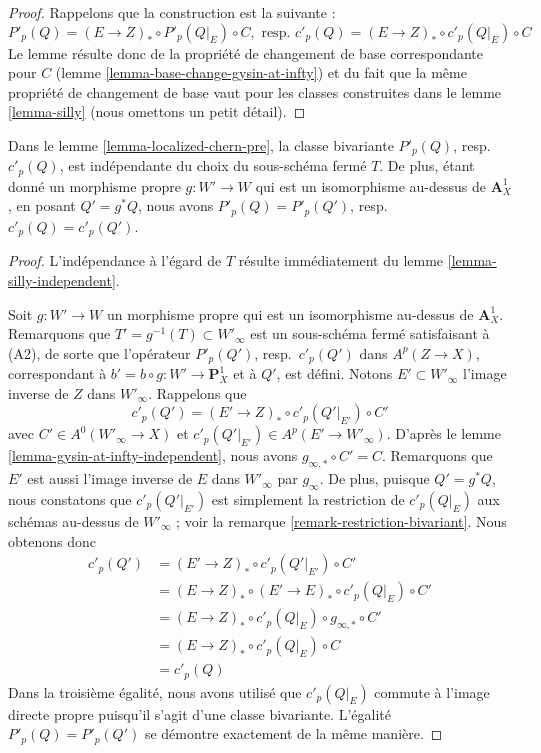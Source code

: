 \begin{proof}
Rappelons que la construction est la suivante :
$$
P'_p(Q) = (E \to Z)_* \circ P'_p(Q|_E) \circ C,\text{ resp. }
c'_p(Q) = (E \to Z)_* \circ c'_p(Q|_E) \circ C
$$
Le lemme résulte donc de la propriété de changement de base correspondante
pour $C$ (lemme \ref{lemma-base-change-gysin-at-infty})
et du fait que la même propriété de changement de base vaut pour les classes
construites dans le lemme \ref{lemma-silly} (nous omettons un petit détail).
\end{proof}

\begin{lemma}
\label{lemma-localized-chern-pre-independent}
Dans le lemme \ref{lemma-localized-chern-pre}, la classe bivariante
$P'_p(Q)$, resp.\ $c'_p(Q)$,
est indépendante du choix du sous-schéma fermé $T$.
De plus, étant donné un morphisme propre $g : W' \to W$ qui est un
isomorphisme au-dessus de $\mathbf{A}^1_X$, en posant $Q' = g^*Q$,
nous avons $P'_p(Q) = P'_p(Q')$, resp.\ $c'_p(Q) = c'_p(Q')$.
\end{lemma}

\begin{proof}
L'indépendance à l'égard de $T$ résulte immédiatement du
lemme \ref{lemma-silly-independent}.

\medskip\noindent
Soit $g : W' \to W$ un morphisme propre qui est un isomorphisme au-dessus de
$\mathbf{A}^1_X$. Remarquons que $T' = g^{-1}(T) \subset W'_\infty$
est un sous-schéma fermé satisfaisant à (A2), de sorte que l'opérateur
$P'_p(Q')$, resp.\ $c'_p(Q')$ dans $A^p(Z \to X)$,
correspondant à $b' = b \circ g : W' \to \mathbf{P}^1_X$
et à $Q'$, est défini. Notons $E' \subset W'_\infty$
l'image inverse de $Z$ dans $W'_\infty$. Rappelons que
$$
c'_p(Q') = (E' \to Z)_* \circ c'_p(Q'|_{E'}) \circ C'
$$
avec $C' \in A^0(W'_\infty \to X)$ et
$c'_p(Q'|_{E'}) \in A^p(E' \to W'_\infty)$.
D'après le lemme \ref{lemma-gysin-at-infty-independent}, nous avons
$g_{\infty, *} \circ C' = C$. Remarquons que $E'$ est aussi
l'image inverse de $E$ dans $W'_\infty$ par $g_\infty$.
De plus, puisque $Q' = g^*Q$, nous constatons que $c'_p(Q'|_{E'})$ est simplement la
restriction de $c'_p(Q|_E)$ aux schémas au-dessus de $W'_\infty$ ; voir la
remarque \ref{remark-restriction-bivariant}. Nous obtenons donc
\begin{align*}
c'_p(Q')
& = 
(E' \to Z)_* \circ c'_p(Q'|_{E'}) \circ C' \\
& =
(E \to Z)_* \circ (E' \to E)_* \circ c'_p(Q|_E) \circ C' \\
& =
(E \to Z)_* \circ c'_p(Q|_E) \circ g_{\infty, *} \circ C' \\
& =
(E \to Z)_* \circ c'_p(Q|_E) \circ C \\
& =
c'_p(Q)
\end{align*}
Dans la troisième égalité, nous avons utilisé que $c'_p(Q|_E)$
commute à l'image directe propre puisqu'il s'agit d'une
classe bivariante. L'égalité $P'_p(Q) = P'_p(Q')$
se démontre exactement de la même manière.
\end{proof}

